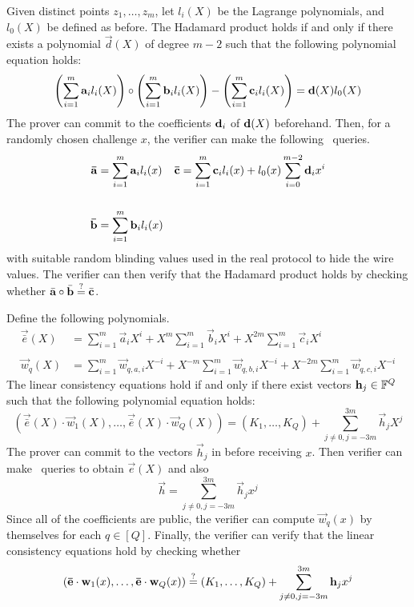 Given distinct points $z_1,\ldots,z_m$, let $l_i(X)$ be the Lagrange polynomials, and $l_0(X)$ be defined as before. The Hadamard product holds if and only if there exists a polynomial $\vec{d}(X)$ of degree $m-2$ such that the following polynomial equation holds:
\begin{align*}
\left( \sum_{i=1}^m \mathbf{a}_i l_i(X) \right) \circ \left( \sum_{i=1}^m \mathbf{b}_i l_i(X) \right) - \left( \sum_{i=1}^m \mathbf{c}_{i} l_i(X) \right) = \mathbf{d}(X) l_0(X)
\end{align*}
 The prover can commit to the coefficients $\mathbf{d}_i$ of $\mathbf{d}(X)$ beforehand. Then, for a randomly chosen challenge $x$, the verifier can make the following \ILC\ queries.
\begin{align*}
\mathbf{\bar{a}} &= \sum_{i=1}^m \mathbf{a}_{i} l_i(x) && \mathbf{\bar{c}} = \sum_{i=1}^m \mathbf{c}_{i} l_i(x) + l_0(x) \sum_{i=0}^{m-2} \mathbf{d}_i x^i \\ \\
\mathbf{\bar{b}} &= \sum_{i=1}^m \mathbf{b}_{i} l_i(x) &
\end{align*}
with suitable random blinding values used in the real protocol to hide the wire values. The verifier can then verify that the Hadamard product holds by checking whether $\bar{\mathbf{a}} \circ \bar{\mathbf{b}} \overset{?}{=} \bar{\mathbf{c}}$.

Define the following polynomials.
\begin{align*}
\vec{\bar{e}}(X) &= \sum_{i=1}^m \vec{a}_i X^i + X^m \sum_{i=1}^m \vec{b}_{i} X^i + X^{2m} \sum_{i=1}^m \vec{c}_{i} X^i \\ \\
\vec{w}_q(X) &= \sum_{i=1}^m \vec{w}_{q,a,i} X^{-i} + X^{-m} \sum_{i=1}^m \vec{w}_{q,b,i} X^{-i} + X^{-2m} \sum_{i=1}^m \vec{w}_{q,c,i} X^{-i}
\end{align*}
The linear consistency equations hold if and only if there exist vectors $\mathbf{h}_j \in \mathbb{F}^Q$ such that the following polynomial equation holds:
\[
( \vec{\bar{e}}(X) \cdot \vec{w}_1(X),\ldots, \vec{\bar{e}}(X)\cdot \vec{w}_Q(X) )  = (K_1,\ldots,K_Q) + \sum_{j\neq 0, j=-3m}^{3m} \vec{h}_j {X^j}
\]
The prover can commit to the vectors $\vec{h}_j$ in before receiving $x$. Then verifier can make \ILC \ queries to obtain $\vec{e}(X)$ and also
\[
\vec{h} = \sum_{j\neq 0, j=-3m}^{3m} \vec{h}_j {x^j}
\]
Since all of the coefficients are public, the verifier can compute $\vec{w}_q(x)$ by themselves for each $q \in [Q]$. Finally, the verifier can verify that the linear consistency equations hold by checking whether
\[
( \mathbf{\bar{e}}\cdot \mathbf{w}_1(x),\ldots, \mathbf{\bar{e}}\cdot \mathbf{w}_Q(x) ) \overset{?}{=} (K_1,\ldots,K_Q) + \sum_{j\neq 0, j=-3m}^{3m} \mathbf{h}_j {x^j}
\]

